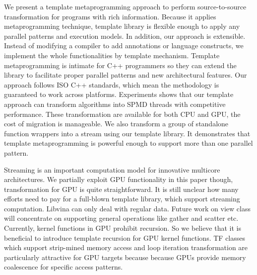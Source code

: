 \documentclass[10pt, conference, compsocconf]{IEEEtran}
\begin{document}

We present a template metaprogramming approach to perform source-to-source
transformation for programs with rich information. Because it applies 
metaprogramming technique, template library is flexible enough to
apply any parallel
patterns and execution models. In addition, our approach
is extensible. Instead of modifying a compiler to add
annotations or language constructs, we implement the whole
functionalities by template mechanism. Template metaprogramming is
intimate for C++ programmers so they can extend the library to
facilitate proper parallel patterns and new architectural
features.  Our approach follows ISO C++ standards, which mean the
methodology is guaranteed to work across platforms.  Experiments shows
that our template approach can transform algorithms into SPMD threads
with competitive performance. These transformation are available for
both CPU and GPU, the cost of migration is manageable. We also
transform a group of standalone function wrappers into a
stream using our template library. It demonstrates that template
metaprogramming is powerful enough to support more than one parallel pattern.


Streaming is an important computation model for innovative
multicore architectures. We partially exploit GPU functionality in this
paper though, transformation for GPU is quite
straightforward.  It is still unclear how many efforts need to
pay for a full-blown template library, which support
streaming computation. Libvina can only deal with regular
data. Future work on view class  will concentrate on supporting general operations like gather and scatter etc.  
Currently, kernel functions in GPU prohibit recursion. So we believe that
it is beneficial to introduce template recursion for GPU kernel functions. TF classes which support strip-mined memory access and loop iteration transformation are
particularly attractive for GPU targets because because  GPUs
provide memory coalescence for specific access patterns.
\end{document}
